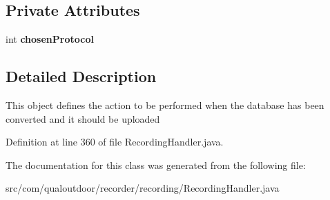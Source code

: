 \subsection*{Private Attributes}
\begin{DoxyCompactItemize}
\item 
\hypertarget{classcom_1_1qualoutdoor_1_1recorder_1_1recording_1_1RecordingHandler_1_1WritingCallbackPreferences_a57750aa0bd4d3265c770e0ae6dcbe1cc}{int {\bfseries chosen\-Protocol}}\label{classcom_1_1qualoutdoor_1_1recorder_1_1recording_1_1RecordingHandler_1_1WritingCallbackPreferences_a57750aa0bd4d3265c770e0ae6dcbe1cc}

\end{DoxyCompactItemize}


\subsection{Detailed Description}
This object defines the action to be performed when the database has been converted and it should be uploaded 

Definition at line 360 of file Recording\-Handler.\-java.



The documentation for this class was generated from the following file\-:\begin{DoxyCompactItemize}
\item 
src/com/qualoutdoor/recorder/recording/Recording\-Handler.\-java\end{DoxyCompactItemize}
